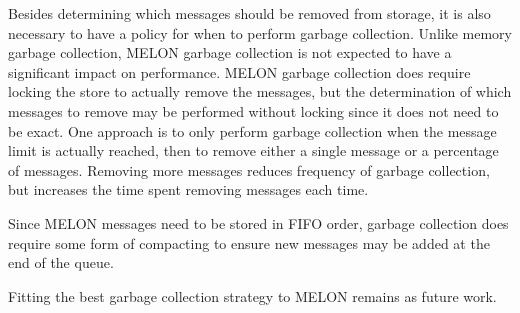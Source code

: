 Besides determining which messages should be removed from storage, it is also necessary to have a policy for when to perform garbage collection. Unlike memory garbage collection, MELON garbage collection is not expected to have a significant impact on performance. MELON garbage collection does require locking the store to actually remove the messages, but the determination of which messages to remove may be performed without locking since it does not need to be exact. One approach is to only perform garbage collection when the message limit is actually reached, then to remove either a single message or a percentage of messages. Removing more messages reduces frequency of garbage collection, but increases the time spent removing messages each time.

Since MELON messages need to be stored in FIFO order, garbage collection does require some form of compacting to ensure new messages may be added at the end of the queue.

Fitting the best garbage collection strategy to MELON remains as future work.